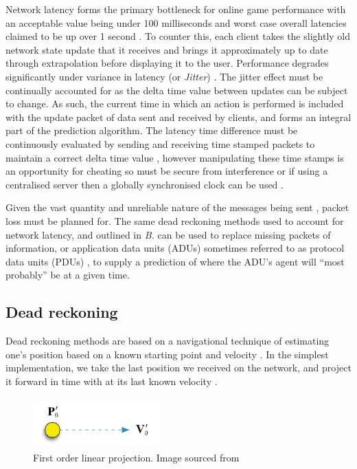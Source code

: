 \documentclass[journal]{IEEEtran}
\begin{document}
Network latency forms the primary bottleneck for online game performance with an acceptable value being under 100 milliseconds \cite{lee2015outatime} \cite{smed2002aspects} and worst case overall latencies claimed to be up over 1 second \cite{claypool2006latency}. To counter this, each client takes the slightly old network state update that it receives and brings it approximately up to date through extrapolation before displaying it to the user. Performance degrades significantly under variance in latency (or \textit{Jitter}) \cite{beigbeder2004effects} \cite{dick2005analysis}. The jitter effect must be continually accounted for as the delta time value between updates can be subject to change. As such, the current time in which an action is performed is included with the update packet of data sent and received by clients, and forms an integral part of the prediction algorithm. The latency time difference must be continuously evaluated by sending and receiving time stamped packets to maintain a correct delta time value \cite{glazer2015multiplayer}, however manipulating these time stamps is an opportunity for cheating \cite{jamin2003cheat} so must be secure from interference or if using a centralised server then a globally synchronised clock can be used \cite{aggarwal2004accuracy}.

Given the vast quantity and unreliable nature of the messages being sent \cite{cronin2001distributed}, packet loss must be planned for. The same dead reckoning methods used to account for network latency, and outlined in \textit{B.} can be used to replace missing packets of information, or application data units (ADUs) \cite{diot1999distributed} sometimes referred to as protocol data units (PDUs) \cite{dis1998ieee}, to supply a prediction of where the ADU's agent will ``most probably'' be at a given time.

\subsection{Dead reckoning} \label{deadReckoning}

Dead reckoning methods are based on a navigational technique of estimating one’s position based on a known starting point and velocity \cite{smed2002aspects}. In the simplest implementation, we take the last position we received on the network, and project it forward in time with at its last known velocity \cite{murphy2011believable}.

\begin{figure}[h]
    \centering
    \includegraphics[width=0.3\linewidth]{DR1.png}
    \caption{First order linear projection. Image sourced from \cite{murphy2011believable}}
    \label{fig:dr1}
\end{figure}
\end{document}
